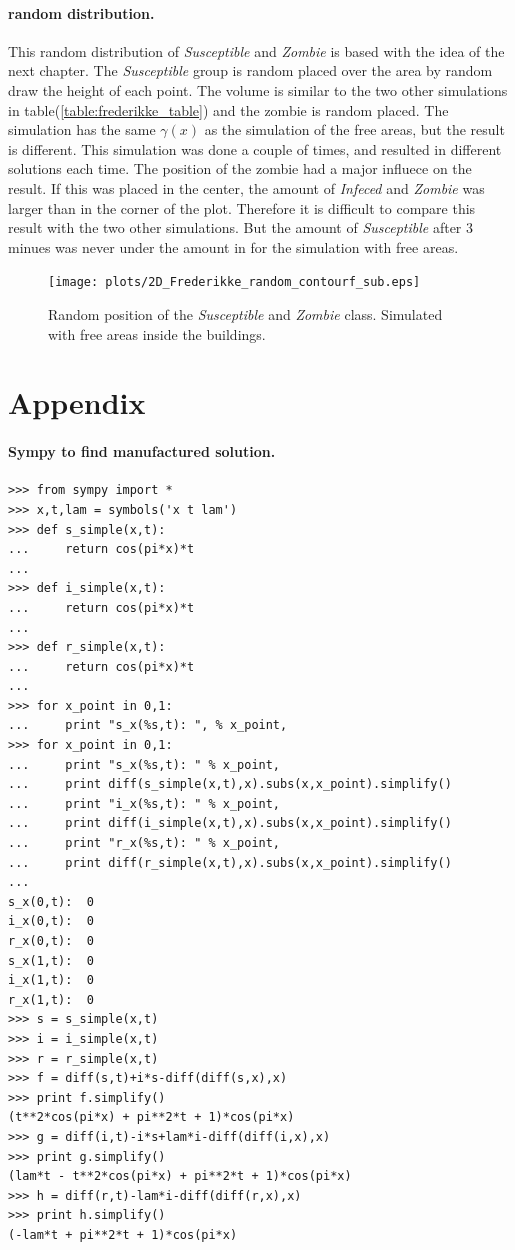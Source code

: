 \documentclass[%
twoside,                 %
final,                   %
10pt]{article}
\begin{document}
\noindent
\paragraph{random distribution.}
This random distribution of \emph{Susceptible} and \emph{Zombie} is based with the idea of the next chapter. The \emph{Susceptible} group is random placed over the area by random draw the height of each point. The volume is similar to the two other simulations in table(\ref{table:frederikke_table}) and the zombie is random placed. The simulation has the same $\gamma(x)$ as the simulation of the free areas, but the result is different. This simulation was done a couple of times, and resulted in different solutions each time. The position of the zombie had a major influece on the result. If this was placed in the center, the amount of \emph{Infeced} and \emph{Zombie} was larger than in the corner of the plot. Therefore it is difficult to compare this result with the two other simulations. But the amount of \emph{Susceptible} after 3 minues was never under the amount in for the simulation with free areas.  


\begin{figure}[ht]
  \centerline{\texttt{[image: plots/2D\_Frederikke\_random\_contourf\_sub.eps]}}
  \caption{
  \label{fig:frederikke_random} Random position of the \emph{Susceptible} and \emph{Zombie} class. Simulated with free areas inside the buildings.
  }
\end{figure}




\section{Appendix}
\paragraph{Sympy to find manufactured solution.}
\begin{Verbatim}[numbers=none,fontsize=\fontsize{9pt}{9pt},baselinestretch=0.95]
>>> from sympy import *
>>> x,t,lam = symbols('x t lam')
>>> def s_simple(x,t):
...     return cos(pi*x)*t
... 
>>> def i_simple(x,t):
...     return cos(pi*x)*t
... 
>>> def r_simple(x,t):
...     return cos(pi*x)*t
... 
>>> for x_point in 0,1:
...     print "s_x(%s,t): ", % x_point,
>>> for x_point in 0,1:
...     print "s_x(%s,t): " % x_point,
...     print diff(s_simple(x,t),x).subs(x,x_point).simplify()
...     print "i_x(%s,t): " % x_point,
...     print diff(i_simple(x,t),x).subs(x,x_point).simplify()
...     print "r_x(%s,t): " % x_point,
...     print diff(r_simple(x,t),x).subs(x,x_point).simplify()
... 
s_x(0,t):  0
i_x(0,t):  0
r_x(0,t):  0
s_x(1,t):  0
i_x(1,t):  0
r_x(1,t):  0
>>> s = s_simple(x,t)
>>> i = i_simple(x,t)
>>> r = r_simple(x,t)
>>> f = diff(s,t)+i*s-diff(diff(s,x),x)
>>> print f.simplify()
(t**2*cos(pi*x) + pi**2*t + 1)*cos(pi*x)
>>> g = diff(i,t)-i*s+lam*i-diff(diff(i,x),x)
>>> print g.simplify()
(lam*t - t**2*cos(pi*x) + pi**2*t + 1)*cos(pi*x)
>>> h = diff(r,t)-lam*i-diff(diff(r,x),x)
>>> print h.simplify()
(-lam*t + pi**2*t + 1)*cos(pi*x)
\end{Verbatim}
\end{document}
